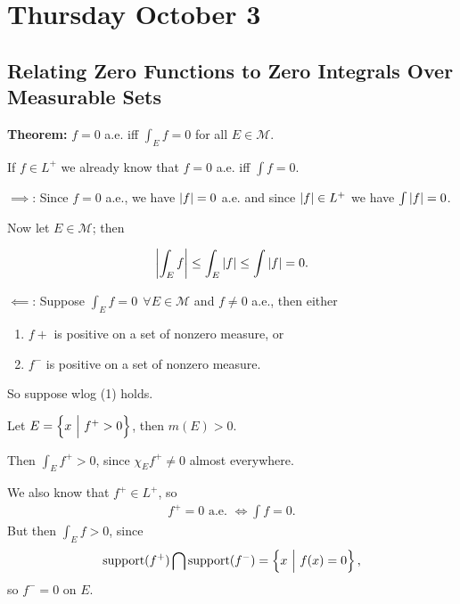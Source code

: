 \hypertarget{thursday-october-3}{%
\section{Thursday October 3}\label{thursday-october-3}}

\hypertarget{relating-zero-functions-to-zero-integrals-over-measurable-sets}{%
\subsection{Relating Zero Functions to Zero Integrals Over Measurable
Sets}\label{relating-zero-functions-to-zero-integrals-over-measurable-sets}}

\textbf{Theorem:} \(f = 0\) a.e. iff \(\int_E f = 0\) for all
\(E\in\mathcal{M}\).

If \(f \in L^+\) we already know that \(f=0\) a.e. iff \(\int f = 0\).

\(\implies\): Since \(f = 0\) a.e., we have \({\left\lvert {f} \right\rvert} = 0\) a.e. and
since \({\left\lvert {f} \right\rvert} \in L^+\) we have \(\int {\left\lvert {f} \right\rvert} = 0\).

Now let \(E \in \mathcal{M}\); then

\begin{align*}
{\left\lvert {\int_E f} \right\rvert} \leq \int_E {\left\lvert {f} \right\rvert} \leq \int {\left\lvert {f} \right\rvert} = 0
.\end{align*}

\(\impliedby\): Suppose \(\int_E f = 0 ~~\forall E \in \mathcal{M}\) and
\(f\neq 0\) a.e., then either

\begin{enumerate}
\def\labelenumi{\arabic{enumi}.}
\item
  \(f+\) is positive on a set of nonzero measure, or
\item
  \(f^-\) is positive on a set of nonzero measure.
\end{enumerate}

So suppose wlog (1) holds.

Let \(E = \left\{{x {~\mathrel{\Big|}~} f^+ > 0}\right\}\), then \(m(E) > 0\).

Then \(\int_E f^+ > 0\), since \(\chi_E f^+ \neq 0\) almost everywhere.

We also know that \(f^+ \in L^+\), so
\begin{align*}
f^+ = 0 \text{ a.e. } \iff \int f = 0
.\end{align*} But then \(\int _E f > 0\), since
\begin{align*}
\mathrm{support}(f^+) \bigcap \mathrm{support}(f^-) = \left\{{x {~\mathrel{\Big|}~} f(x) = 0}\right\}
,\end{align*} so \(f^- = 0\) on \(E\).

